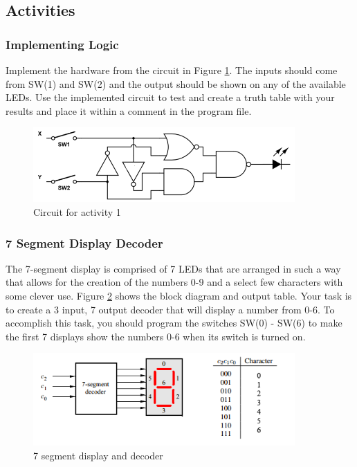 \subsection{Activities}

\subsubsection{Implementing Logic}

Implement the hardware from the circuit in Figure \ref{fig:circuit1}. The inputs should come from SW(1) and SW(2) and the output should be shown on any of the available LEDs. Use the implemented circuit to test and create a truth table with your results and place it within a comment in the program file.

\begin{figure}[H]
	\centering
	\includegraphics[width=100mm]{Lab1/figures/circuit1.png}
	\caption{Circuit for activity 1}
	\label{fig:circuit1}
\end{figure}

\subsubsection{7 Segment Display Decoder}

The 7-segment display is comprised of 7 LEDs that are arranged in such a way that allows for the creation of the numbers 0-9 and a select few characters with some clever use. Figure \ref{fig:7seg} shows the block diagram and output table. Your task is to create a 3 input, 7 output decoder that will display a number from 0-6. To accomplish this task, you should program the switches SW(0) - SW(6) to make the first 7 displays show the numbers 0-6 when its switch is turned on.

\begin{figure}[H]
	\centering
	\includegraphics[width=100mm]{Lab1/figures/7seg.png}
	\caption{7 segment display and decoder}
	\label{fig:7seg}
\end{figure}

